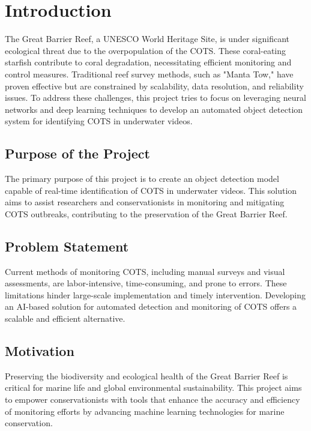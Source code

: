 \documentclass[conference]{IEEEtran}
\begin{document}

\section{Introduction}
The Great Barrier Reef, a UNESCO World Heritage Site, is under significant ecological threat due to the overpopulation of the COTS. These coral-eating starfish contribute to coral degradation, necessitating efficient monitoring and control measures. Traditional reef survey methods, such as "Manta Tow," have proven effective but are constrained by scalability, data resolution, and reliability issues. To address these challenges, this project tries to focus on leveraging neural networks and deep learning techniques to develop an automated object detection system for identifying COTS in underwater videos.

\subsection{Purpose of the Project}
The primary purpose of this project is to create an object detection model capable of real-time identification of COTS in underwater videos. This solution aims to assist researchers and conservationists in monitoring and mitigating COTS outbreaks, contributing to the preservation of the Great Barrier Reef.

\subsection{Problem Statement}
Current methods of monitoring COTS, including manual surveys and visual assessments, are labor-intensive, time-consuming, and prone to errors. These limitations hinder large-scale implementation and timely intervention. Developing an AI-based solution for automated detection and monitoring of COTS offers a scalable and efficient alternative.

\subsection{Motivation}
Preserving the biodiversity and ecological health of the Great Barrier Reef is critical for marine life and global environmental sustainability. This project aims to empower conservationists with tools that enhance the accuracy and efficiency of monitoring efforts by advancing machine learning technologies for marine conservation.
\end{document}
